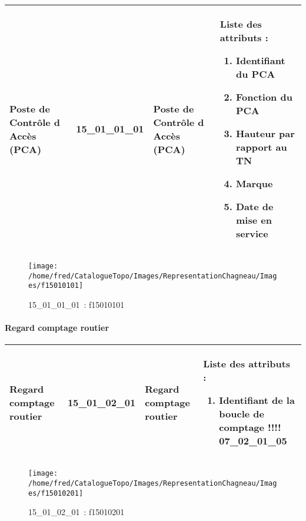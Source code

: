 \documentclass[12pt,titlepage]{book}
\begin{document}
\renewcommand{\arraystretch}{1.2}
\begin{supertabular}{|p{10cm}|c|p{13cm}|p{12cm}|}
 Poste de Contrôle d Accès (PCA) & 15\_01\_01\_01 & Poste de Contrôle d Accès (PCA) & Liste des attributs :
\begin{enumerate}
  \item Identifiant du PCA  \item Fonction du PCA  \item Hauteur par rapport au TN  \item Marque  \item Date de mise en service\end{enumerate}
\\
\hline
\end{supertabular}
\begin{figure}[h!]
  \hfill         %
  \begin{minipage}[t]{3cm}
    \begin{center}
      \texttt{[image: /home/fred/CatalogueTopo/Images/RepresentationChagneau/Images/f15010101]}
      \caption[~15\_01\_01\_01]{\small{15\_01\_01\_01~:} \tiny{f15010101}}\label{f15010101}
    \end{center}
  \end{minipage}
\end{figure}


\paragraph{Regard comptage routier}
\noindent
\vspace{\baselineskip}

\renewcommand{\arraystretch}{1.2}
\begin{supertabular}{|p{10cm}|c|p{13cm}|p{12cm}|}
 Regard comptage routier & 15\_01\_02\_01 & Regard comptage routier & Liste des attributs :
\begin{enumerate}
  \item Identifiant de la boucle de comptage !!!!  07\_02\_01\_05\end{enumerate}
\\
\hline
\end{supertabular}
\begin{figure}[h!]
  \hfill         %
  \begin{minipage}[t]{3cm}
    \begin{center}
      \texttt{[image: /home/fred/CatalogueTopo/Images/RepresentationChagneau/Images/f15010201]}
      \caption[~15\_01\_02\_01]{\small{15\_01\_02\_01~:} \tiny{f15010201}}\label{f15010201}
    \end{center}
  \end{minipage}
\end{figure}
\end{document}
